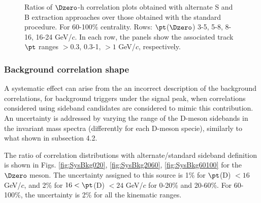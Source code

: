 \begin{figure}
 \caption{Ratios of $\Dzero$-h correlation plots obtained with alternate S and B extraction approaches over those obtained with the standard procedure. For 60-100\% centrality. Rows: $\pt$($\Dzero$) 3-5, 5-8, 8-16, 16-24 GeV/$c$. In each row, the panels show the associated track
$\pt$ ranges $> 0.3$, 0.3-1, $> 1$ GeV/$c$, respectively.}
\label{fig:SysSandB60100}
\end{figure}

\subsubsection{Background correlation shape}
A systematic effect can arise from the an incorrect description of the background correlations, for background triggers under the signal peak, when correlations considered using sideband candidates are considered to mimic this contribution. An uncertainty is addressed by varying the range of the D-meson sidebands in the invariant mass spectra (differently for each D-meson specie), similarly to what shown in subsection 4.2.

The ratio of correlation distributions with alternate/standard sideband definition is shown in Figs. \ref{fig:SysBkg020}, \ref{fig:SysBkg2060}, \ref{fig:SysBkg60100} for the $\Dzero$ meson. The uncertainty assigned to this source is 1\% for $\pt$(D) $< 16$ GeV/$c$, and 2\% for $16 < \pt$(D) $< 24$ GeV/$c$ for 0-20\% and 20-60\%. For 60-100\%, the uncertainty is 2\% for all the kinematic ranges.

